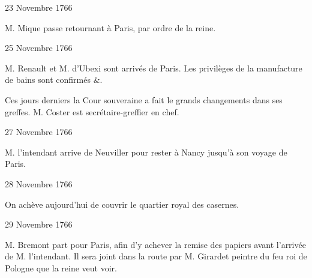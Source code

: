                      \begin{diary}{23 Novembre 1766}{}
                        
                        
                           M. Mique passe retournant à
                              Paris, par
                           ordre de la reine. \bigskip
        
        
                     \end{diary}
                     
                     

                     \begin{diary}{25 Novembre 1766}{}
                        
                        
                           M. Renault et M. d’Ubexi sont arrivés
                           de Paris. Les privilèges de
                              la manufacture
                              de bains sont confirmés &. \bigskip
        
        
                         Ces jours derniers la Cour souveraine
                           a fait le grands changements dans ses greffes.
                           M. Coster est
                           secrétaire-greffier en chef. \bigskip
        
        
                     \end{diary}

                     \begin{diary}{27 Novembre 1766}{}
                        
                        
                           M. l’intendant arrive de Neuviller pour
                           rester à Nancy jusqu’à son
                           voyage de Paris. \bigskip
        
        
                     \end{diary}

                     \begin{diary}{28 Novembre 1766}{}
                        
                         On achève aujourd'hui de couvrir
                              le
                              quartier royal des casernes. \bigskip
        
        
                     \end{diary}

                     \begin{diary}{29 Novembre 1766}{}
                        
                        
                           M. Bremont part pour Paris, afin d’y
                           achever la remise des papiers avant
                           l’arrivée de M. l’intendant.
                           Il sera joint
                           dans la route par M. Girardet
                           peintre
                           du feu roi de Pologne que la
                              reine veut voir. \bigskip
        
        
                     \end{diary}


